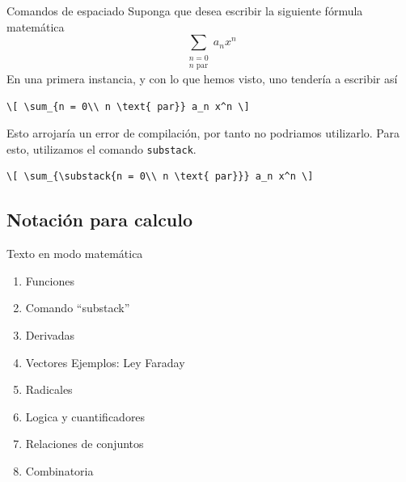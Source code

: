 \documentclass[../slides.tex]{subfiles}
\begin{document}
    \begin{frame}[fragile]{Comandos de espaciado}
        Suponga que desea escribir la siguiente fórmula matemática
            \[ \sum_{\substack{n = 0\\ n \text{ par}}} a_n x^n \]
            \pause
        En una primera instancia, y con lo que hemos visto, uno tendería a escribir así
            \begin{verbatim}
\[ \sum_{n = 0\\ n \text{ par}} a_n x^n \]
            \end{verbatim}
        \pause
        Esto arrojaría un error de compilación, por tanto no podriamos utilizarlo. \pause Para esto, utilizamos el comando \texttt{substack}.
            \begin{verbatim}
\[ \sum_{\substack{n = 0\\ n \text{ par}}} a_n x^n \]
            \end{verbatim}

    \end{frame} 
    
    \subsection{Notación para calculo}

    \begin{frame}{Texto en modo matemática}
    \end{frame}
        \begin{enumerate}
        \item{Funciones}
            \item{Comando ``substack''}
        \item{Derivadas}
        \item{Vectores}
            Ejemplos: Ley Faraday
    
        \item{Radicales}
        
        \item{Logica y cuantificadores}
        
        \item{Relaciones de conjuntos}
        
        \item{Combinatoria} 
        \end{enumerate}
\end{document}
